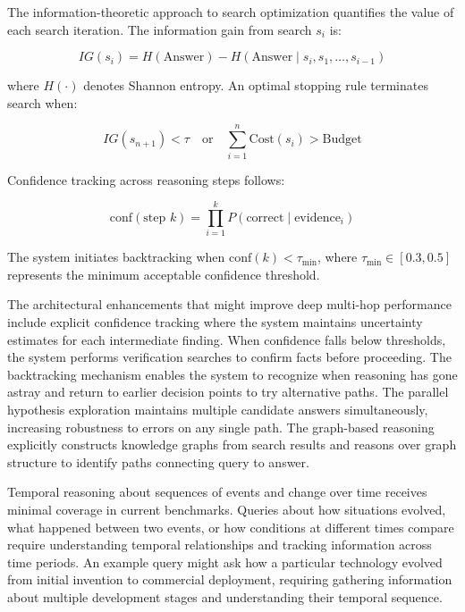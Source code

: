 The information-theoretic approach to search optimization quantifies the value of each search iteration. The information gain from search $s_i$ is:

\begin{equation}
IG(s_i) = H(\text{Answer}) - H(\text{Answer} \mid s_i, s_1, \ldots, s_{i-1})
\label{eq:information_gain}
\end{equation}

where $H(\cdot)$ denotes Shannon entropy. An optimal stopping rule terminates search when:

\begin{equation}
IG(s_{n+1}) < \tau \quad \text{or} \quad \sum_{i=1}^{n} \text{Cost}(s_i) > \text{Budget}
\label{eq:stopping_rule}
\end{equation}

Confidence tracking across reasoning steps follows:

\begin{equation}
\text{conf}(\text{step } k) = \prod_{i=1}^{k} P(\text{correct} \mid \text{evidence}_i)
\label{eq:confidence_tracking}
\end{equation}

The system initiates backtracking when $\text{conf}(k) < \tau_{\text{min}}$, where $\tau_{\text{min}} \in [0.3, 0.5]$ represents the minimum acceptable confidence threshold.

The architectural enhancements that might improve deep multi-hop performance include explicit confidence tracking where the system maintains uncertainty estimates for each intermediate finding. When confidence falls below thresholds, the system performs verification searches to confirm facts before proceeding. The backtracking mechanism enables the system to recognize when reasoning has gone astray and return to earlier decision points to try alternative paths. The parallel hypothesis exploration maintains multiple candidate answers simultaneously, increasing robustness to errors on any single path. The graph-based reasoning explicitly constructs knowledge graphs from search results and reasons over graph structure to identify paths connecting query to answer.

Temporal reasoning about sequences of events and change over time receives minimal coverage in current benchmarks. Queries about how situations evolved, what happened between two events, or how conditions at different times compare require understanding temporal relationships and tracking information across time periods. An example query might ask how a particular technology evolved from initial invention to commercial deployment, requiring gathering information about multiple development stages and understanding their temporal sequence.


